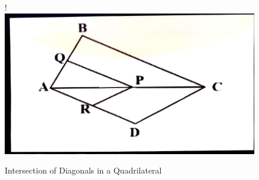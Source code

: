 \documentclass[12pt,-letter paper]{article}
\begin{document}
\begin{enumerate}
\begin{figure}[!ht]
  \begin{center}
   {!} {
  \includegraphics[width=\columnwidth]{figs/Construction-2.jpg}}
  \end{center}
  \caption{Intersection of Diagonals in a Quadrilateral}
  \label{fig:Construction-2.jpg}
\end{figure}

\end{enumerate}
\end{document}
